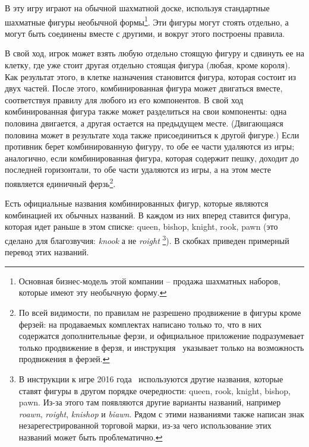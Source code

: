 \documentclass{article}
\begin{document}
В эту игру играют на обычной шахматной доске,
используя стандартные шахматные фигуры необычной формы\footnote{
    Основная бизнес-модель этой компании -- продажа шахматных наборов, которые имеют эту необычную форму.
}.
Эти фигуры могут стоять отдельно, а могут быть соединены вместе с другими, 
и вокруг этого построены правила.

В свой ход, игрок может взять любую отдельно стоящую фигуру
и сдвинуть ее на клетку, где уже стоит другая отдельно стоящая фигура (любая, кроме короля).
Как результат этого, в клетке назначения становится фигура, которая состоит из двух частей.
После этого, комбинированная фигура может двигаться вместе,
соответствуя правилу для любого из его компонентов.
В свой ход комбинированная фигура также может разделиться на свои компоненты:
одна половина двигается, а другая остается на предыдущем месте.
(Двигающаяся половина может в результате хода также присоединиться к другой фигуре.)
Если противник берет комбинированную фигуру, то обе ее части удаляются из игры;
аналогично, если комбинированная фигура, которая содержит пешку, доходит до последней горизонтали,
то обе части удаляются из игры, а на этом месте появляется единичный ферзь\footnote{
    По всей видимости, по правилам не разрешено продвижение в фигуры кроме ферзей:
    на продаваемых комплектах написано только то, что в них содержатся дополнительные ферзи,
    и официальное приложение подразумевает только продвижение в ферзя,
    и инструкция~\cite{chessplus-rules} указывает только на возможность продвижения в ферзей.
}.

Есть официальные названия комбинированных фигур,
которые являются комбинацией их обычных названий.
В каждом из них вперед ставится фигура,
которая идет раньше в этом списке:
queen, bishop, knight, rook, pawn (это сделано для благозвучия: \emph{knook} а не \emph{roight}
\footnote{
    В инструкции к игре 2016 года~\cite{chessplus-rules} используются другие названия, которые
    ставят фигуры в другом порядке очередности: queen, rook, knight, bishop, pawn.
    Из-за этого там появляются другие варианты названий,
    например \emph{roawn}, \emph{roight}, \emph{knishop} и \emph{biawn}.
    Рядом с этими названиями также написан знак незарегестрированной торговой марки,
    из-за чего использование этих названий может быть проблематично.
}).
В скобках приведен примерный перевод этих названий.
\end{document}

